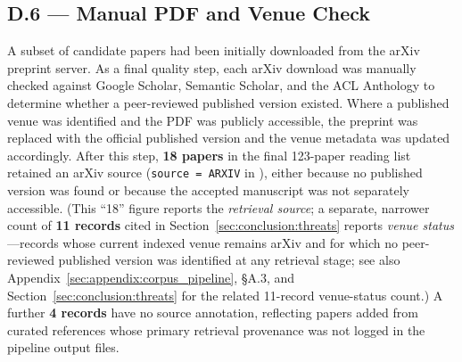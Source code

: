 \subsection*{D.6 — Manual PDF and Venue Check}
\label{app:search_log:pdf}

A subset of candidate papers had been initially downloaded from the arXiv preprint
server. As a final quality step, each arXiv download was manually checked against
Google Scholar, Semantic Scholar, and the ACL Anthology to determine whether a
peer-reviewed published version existed. Where a published venue was identified and
the PDF was publicly accessible, the preprint was replaced with the official published
version and the venue metadata was updated accordingly. After this step,
\textbf{18 papers} in the final 123-paper reading list retained an arXiv source
(\texttt{source = ARXIV} in ),
either because no published version was found or because the accepted manuscript was
not separately accessible. (This ``18'' figure reports the \emph{retrieval source};
a separate, narrower count of \textbf{11 records} cited in
Section~\ref{sec:conclusion:threats} reports \emph{venue status}---records
whose current indexed venue remains arXiv and for which no peer-reviewed
published version was identified at any retrieval stage; see also
Appendix~\ref{sec:appendix:corpus_pipeline}, \S A.3, and
Section~\ref{sec:conclusion:threats} for the related 11-record venue-status
count.) A further \textbf{4 records} have no source annotation,
reflecting papers added from curated references whose primary retrieval provenance was
not logged in the pipeline output files.
